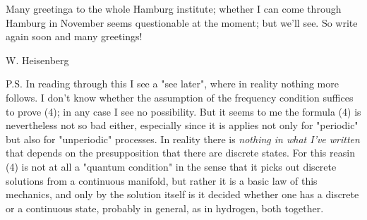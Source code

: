 Many greetinga to the whole Hamburg institute; whether I can come through Hamburg in November seems questionable at the moment; but we'll see. So write again soon and many greetings!

W. Heisenberg

P.S. In reading through this I see a "see later", where in reality nothing more follows. I don't know whether the assumption of the frequency condition suffices to prove (4); in any case I see no possibility. But it seems to me the formula (4) is nevertheless not so bad either, especially since it is applies not only for "periodic" but also for "unperiodic" processes. In reality there is \textit{nothing in what I've written} that depends on the presupposition that there are discrete states. For this reasin (4) is not at all a "quantum condition" in the sense that it picks out discrete solutions from a continuous manifold, but rather it is a basic law of this mechanics, and only by the solution itself is it decided whether one has a discrete or a continuous state, probably in general, as in hydrogen, both together.